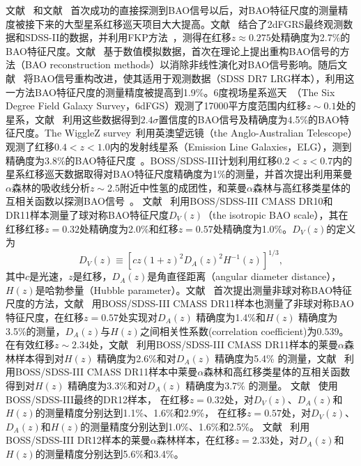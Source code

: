 文献 ~和文献 ~首次成功的直接探测到BAO信号以后，对BAO特征尺度的测量精度被接下来的大型星系红移巡天项目大大提高。文献 ~结合了2dFGRS最终观测数据和SDSS-II的数据，并利用FKP方法~\cite{Feldman1994}，测得在红移$z \approx 0.275$处精确度为2.7\%的BAO特征尺度。文献 ~基于数值模拟数据，首次在理论上提出重构BAO信号的方法（BAO reconstruction methods）以消除非线性演化对BAO信号影响。随后文献 ~将BAO信号重构改进，使其适用于观测数据（SDSS DR7 LRG样本），利用这一方法BAO特征尺度的测量精度被提高到1.9\%。6度视场星系巡天~\cite{Jones2009}（The Six Degree Field Galaxy Survey，6dFGS）观测了17000平方度范围内红移$z \sim 0.1$处的星系，文献 ~利用这些数据得到$2.4\sigma$置信度的BAO信号及精确度为4.5\%的BAO特征尺度。The WiggleZ survey~\cite{Drinkwater2010}利用英澳望远镜（the Anglo-Australian Telescope）观测了红移$0.4 < z < 1.0$内的发射线星系（Emission Line Galaxies，ELG），测到精确度为3.8\%的BAO特征尺度~\cite{Blake2011}。BOSS/SDSS-III计划利用红移$0.2 < z < 0.7$内的星系红移巡天数据取得对BAO特征尺度精确度为1\%的测量，并首次提出利用莱曼$\alpha$森林的吸收线分析$z \sim 2.5$附近中性氢的成团性，和莱曼$\alpha$森林与高红移类星体的互相关函数以探测BAO信号~\cite{White2003,McDonald2007}。
文献 ~利用BOSS/SDSS-III CMASS DR10和DR11样本测量了球对称BAO特征尺度$D_V(z)$（the isotropic BAO scale），其在红移红移$z=0.32$处精确度为2.0\%和红移$z=0.57$处精确度为1.0\%。$D_V(z)$的定义为
\begin{equation}
D_V(z) \equiv \left[ cz (1+z)^2 D_A(z)^2 H^{-1}(z) \right]^{1/3},
\end{equation}
其中$c$是光速，$z$是红移，$D_A(z)$是角直径距离（angular diameter distance），$H(z)$是哈勃参量（Hubble parameter）。文献 ~首次提出测量非球对称BAO特征尺度的方法，文献 ~用BOSS/SDSS-III CMASS DR11样本也测量了非球对称BAO特征尺度，在红移$z=0.57$处实现对$D_A(z)$ 精确度为1.4\%和$H(z)$ 精确度为3.5\%的测量，$D_A(z)$与$H(z)$之间相关性系数(correlation coefficient)为$0.539$。
在有效红移$z \sim 2.34$处，文献 ~利用BOSS/SDSS-III CMASS DR11样本的莱曼$\alpha$森林样本得到对$H(z)$ 精确度为2.6\%和对$D_A(z)$ 精确度为5.4\% 的测量，文献 ~利用BOSS/SDSS-III CMASS DR11样本中莱曼$\alpha$森林和高红移类星体的互相关函数得到对$H(z)$ 精确度为3.3\%和对$D_A(z)$ 精确度为3.7\% 的测量。
文献 ~使用BOSS/SDSS-III最终的DR12样本，
在红移$z=0.32$处，对$D_V(z)$、$D_A(z)$和$H(z)$的测量精度分别达到1.1\%、1.6\%和2.9\%，
在红移$z=0.57$处，对$D_V(z)$、$D_A(z)$和$H(z)$的测量精度分别达到1.0\%、1.6\%和2.5\%。
文献 ~利用BOSS/SDSS-III DR12样本的莱曼$\alpha$森林样本，在红移$z=2.33$处，对$D_A(z)$和$H(z)$的测量精度分别达到5.6\%和3.4\%。

